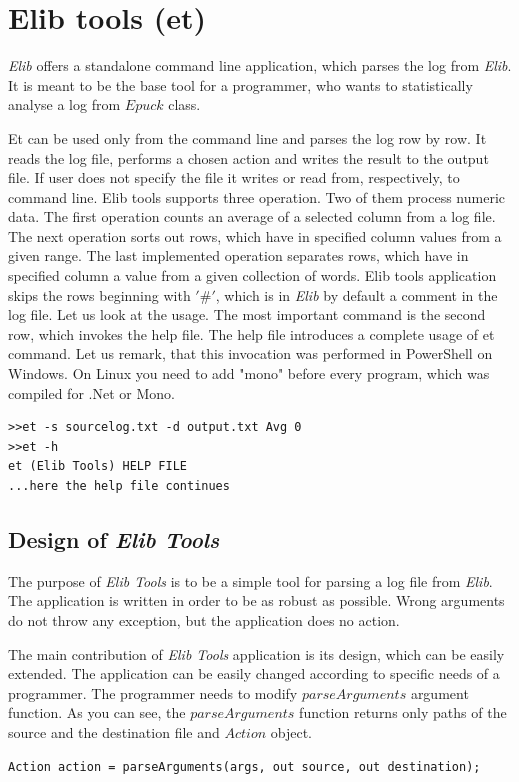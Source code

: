 \section{Elib tools (et)}\label{sec:et}
  {\it Elib} offers a standalone command line application, which
  parses the log from {\it Elib}. It is meant to be the base tool for a programmer,
  who wants to statistically analyse a log from $Epuck$ class.

  Et can be used only from the command line and parses the log row by row.
  It reads the log file, performs a chosen action and writes the result to the output file.
  If user does not specify the file it writes or read from, respectively, to command line.
  Elib tools supports three operation. Two of them process numeric data.
  The first operation counts an average of a selected column from a log file.
  The next operation sorts out rows, which have in specified column values from a given range.
  The last implemented operation separates rows, 
  which have in specified column a value from a given collection of words.
  Elib tools application skips the rows beginning with $'\#'$, 
  which is in {\it Elib} by default a comment in the log file.
  Let us look at the usage. The most important command is the second row, which invokes the help file.
  The help file introduces a complete usage of et command.
  Let us remark, that this invocation was performed in PowerShell on Windows. On Linux you need to add "mono" before every program,
  which was compiled for .Net or Mono.
\begin{verbatim}
>>et -s sourcelog.txt -d output.txt Avg 0
>>et -h
et (Elib Tools) HELP FILE
...here the help file continues
\end{verbatim}

\subsection*{Design of {\it Elib Tools}}\label{sec:design}
  The purpose of {\it Elib Tools} is to be a simple tool for parsing a log file from {\it Elib}.
  The application is written in order to be as robust as possible.
  Wrong arguments do not throw any exception, but the application does no action.

  The main contribution of {\it Elib Tools} application is its design, which can be easily extended.
  The application can be easily changed according to specific needs of a programmer.
  The programmer needs to modify $parseArguments$ argument function.
  As you can see, the $parseArguments$ function returns only paths 
  of the source and the destination file and $Action$ object.
\begin{lstlisting}
Action action = parseArguments(args, out source, out destination);
\end{lstlisting}
  
